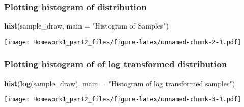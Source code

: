 \documentclass[]{article}
\newenvironment{Shaded}{\begin{snugshade}}{\end{snugshade}}
\newcommand{\KeywordTok}[1]{\textcolor[rgb]{0.13,0.29,0.53}{\textbf{#1}}}
\newcommand{\DataTypeTok}[1]{\textcolor[rgb]{0.13,0.29,0.53}{#1}}
\newcommand{\StringTok}[1]{\textcolor[rgb]{0.31,0.60,0.02}{#1}}
\newcommand{\NormalTok}[1]{#1}
\begin{document}
\subsubsection{Plotting histogram of
distribution}\label{plotting-histogram-of-distribution}

\begin{Shaded}
\begin{Highlighting}[]
\KeywordTok{hist}\NormalTok{(sample_draw,}
     \DataTypeTok{main =} \StringTok{"Histogram of Samples"}\NormalTok{)}
\end{Highlighting}
\end{Shaded}

\texttt{[image: Homework1\_part2\_files/figure-latex/unnamed-chunk-2-1.pdf]}

\subsubsection{Plotting histogram of of log transformed
distribution}\label{plotting-histogram-of-of-log-transformed-distribution}

\begin{Shaded}
\begin{Highlighting}[]
\KeywordTok{hist}\NormalTok{(}\KeywordTok{log}\NormalTok{(sample_draw),}
     \DataTypeTok{main =} \StringTok{"Histogram of log transformed samples"}\NormalTok{)}
\end{Highlighting}
\end{Shaded}

\texttt{[image: Homework1\_part2\_files/figure-latex/unnamed-chunk-3-1.pdf]}
\end{document}
